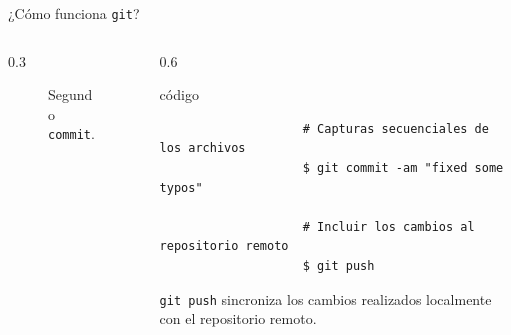\documentclass{beamer}
\begin{document}
\begin{frame}[fragile]{¿Cómo funciona \texttt{git}?}
    \begin{columns}
        \begin{column}{0.3\textwidth}
            \begin{figure}
                \centering
                
                \caption{Segundo \texttt{commit}.}
            \end{figure}
        \end{column}
        \begin{column}{0.6\textwidth}
            \begin{exampleblock}{código}
                \scriptsize
                \begin{verbatim}
                    # Capturas secuenciales de los archivos
                    $ git commit -am "fixed some typos"

                    # Incluir los cambios al repositorio remoto
                    $ git push
                \end{verbatim}
            \end{exampleblock}
            \texttt{git push} sincroniza los cambios realizados localmente con el repositorio remoto. 
        \end{column}
    \end{columns}
\end{frame}
\end{document}
